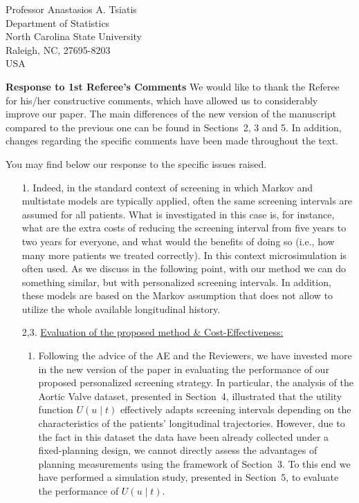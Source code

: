 \documentclass[a4paper, 11pt]{letter}
\begin{document}
\begin{letter}{Professor Anastasios A. Tsiatis\\
Department of Statistics\\
North Carolina State University\\
Raleigh, NC, 27695-8203\\
USA}

\newpage
\textbf{Response to 1st Referee's Comments}
\newline \newline
We would like to thank the Referee for his/her constructive comments, which have allowed us to considerably improve our paper. The main differences of the new version of the manuscript compared to the previous one can be found in Sections~2, 3 and 5. In addition, changes regarding the specific comments have been made throughout the text.

You may find below our response to the specific issues raised.

\begin{enumerate} \itemsep=22pt
\item[1.] Indeed, in the standard context of screening in which Markov and multistate models are typically applied, often the same screening intervals are assumed for all patients. What is investigated in this case is, for instance, what are the extra costs of reducing the screening interval from five years to two years for everyone, and what would the benefits of doing so (i.e., how many more patients we treated correctly). In this context microsimulation is often used. As we discuss in the following point, with our method we can do something similar, but with personalized screening intervals. In addition, these models are based on the Markov assumption that does not allow to utilize the whole available longitudinal history.

\item[2,3.] \underline{Evaluation of the proposed method \& Cost-Effectiveness:}
    \begin{enumerate}
    \item Following the advice of the AE and the Reviewers, we have invested more in the new version of the paper in evaluating the performance of our proposed personalized screening strategy. In particular, the analysis of the Aortic Valve dataset, presented in Section~4, illustrated that the utility function $U(u \mid t)$ effectively adapts screening intervals depending on the characteristics of the patients' longitudinal trajectories. However, due to the fact in this dataset the data have been already collected under a fixed-planning design, we cannot directly assess the advantages of planning measurements using the framework of Section~3. To this end we have performed a simulation study, presented in Section~5, to evaluate the performance of $U(u \mid t)$.


\end{enumerate}
\end{enumerate}
\end{letter}
\end{document}
